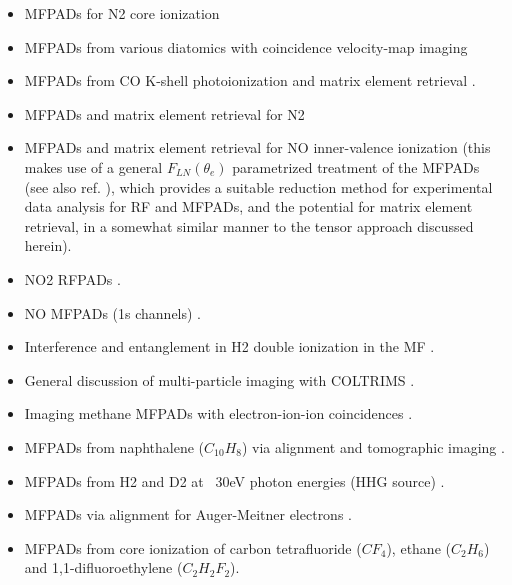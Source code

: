 \begin{itemize}
\item MFPADs for N2 core ionization \cite{Shigemasa1995}
\item MFPADs from various diatomics with coincidence velocity-map imaging \cite{Eland2000} \cite{Hikosaka2000}
\item MFPADs from CO K-shell photoionization \cite{motoki2000KshellPhotoionizationCO} and matrix element retrieval \cite{Cherepkov2000}.
\item MFPADs and matrix element retrieval for N2 \cite{Gessner2002a}
\item MFPADs and matrix element retrieval for NO inner-valence ionization \cite{Lucchese2002,Lebech2003} (this makes use of a general $F_{LN}(\theta_e)$ parametrized treatment of the MFPADs (see also ref. \cite{Lafosse2002}), which provides a suitable reduction method for experimental data analysis for RF and MFPADs, and the potential for matrix element retrieval, in a somewhat similar manner to the tensor approach discussed herein). %
\item NO2 RFPADs \cite{Toffoli2007}.
\item NO MFPADs (1s channels) \cite{Li2007}.
\item Interference and entanglement in H2 double ionization in the MF \cite{Akoury2007}.
\item General discussion of multi-particle imaging with COLTRIMS \cite{Trinter2012a}.
\item Imaging methane MFPADs with electron-ion-ion coincidences \cite{Williams2012, Williams2012a}.
\item MFPADs from naphthalene ($C_{10}H_{8}$) via alignment and tomographic imaging \cite{Maurer2012}.
\item MFPADs from H2 and D2 at ~30eV photon energies (HHG source) \cite{Billaud2012a}.
\item MFPADs via alignment for Auger-Meitner electrons \cite{Cryan2010,Cryan2012a}.
\item MFPADs from core ionization of carbon tetrafluoride ($CF_4$), ethane ($C_2H_6$) and 1,1-difluoroethylene ($C_2 H_2 F_2$)\cite{Menssen2016}.
\end{itemize}

